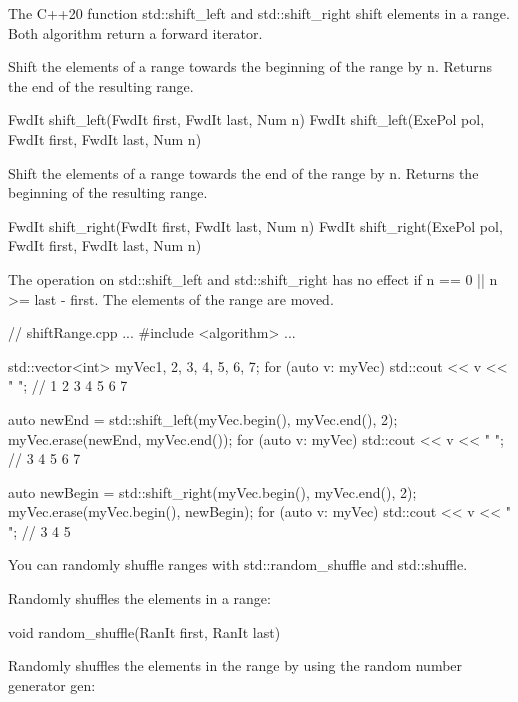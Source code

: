 
The C++20 function std::shift\_left and std::shift\_right shift elements in a range. Both algorithm return a forward iterator.

Shift the elements of a range towards the beginning of the range by n. Returns the end of the resulting range.

\begin{cpp}
FwdIt shift_left(FwdIt first, FwdIt last, Num n)
FwdIt shift_left(ExePol pol, FwdIt first, FwdIt last, Num n)
\end{cpp}

Shift the elements of a range towards the end of the range by n. Returns the beginning of the resulting range.

\begin{cpp}
FwdIt shift_right(FwdIt first, FwdIt last, Num n)
FwdIt shift_right(ExePol pol, FwdIt first, FwdIt last, Num n)
\end{cpp}

The operation on std::shift\_left and std::shift\_right has no effect if n == 0 || n >= last - first. The elements of the range are moved.


\begin{cpp}
// shiftRange.cpp
...
#include <algorithm>
...

std::vector<int> myVec{1, 2, 3, 4, 5, 6, 7};
for (auto v: myVec) std::cout << v << " "; // 1 2 3 4 5 6 7

auto newEnd = std::shift_left(myVec.begin(), myVec.end(), 2);
myVec.erase(newEnd, myVec.end());
for (auto v: myVec) std::cout << v << " "; // 3 4 5 6 7

auto newBegin = std::shift_right(myVec.begin(), myVec.end(), 2);
myVec.erase(myVec.begin(), newBegin);
for (auto v: myVec) std::cout << v << " "; // 3 4 5
\end{cpp}


You can randomly shuffle ranges with std::random\_shuffle and std::shuffle.

Randomly shuffles the elements in a range:

\begin{cpp}
void random_shuffle(RanIt first, RanIt last)
\end{cpp}

Randomly shuffles the elements in the range by using the random number generator gen:

